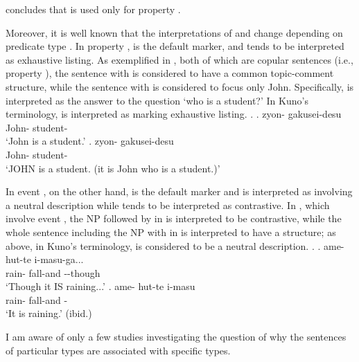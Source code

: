  concludes that
 is used only for property .

Moreover, it is well known that
the interpretations of  and  change
depending on predicate type \cite{kuroda72,kuno73}.
In property ,
 is the default marker, and
 tends to be interpreted as exhaustive listing.
As exemplified in \Next[a-b], both of which are copular sentences (i.e., property ),
the sentence with  \Next[a] is considered to have a common topic-comment structure,
while the sentence with  \Next[b] is considered to focus only John.
Specifically, \Next[b] is interpreted as the answer to the question `who is a student?'
In Kuno's terminology,
 is interpreted as marking exhaustive listing.
%
\largerpage
\ex.
 \ag. zyon- gakusei-desu \\
      John- student- \\
      `John is a student.'
 \bg. zyon- gakusei-desu \\
      John- student- \\
      `JOHN is a student. (it is John who is a student.)'
      \hfill{\cite[38]{kuno73}}

In event ,
on the other hand,
 is the default marker and is interpreted as involving a neutral description %
while  tends to be interpreted as contrastive.
In \Next[a-b], which involve event ,
the NP followed by  in \Next[a] is interpreted to be contrastive,
while the whole sentence including the NP with  in \Next[b] is interpreted to have a  structure;
as above, in Kuno's terminology,
 is considered to be a neutral description.
%
\ex.
 \ag. ame- hut-te i-masu-ga... \\
      rain- fall-and --though \\
      `Though it IS raining...'
 \bg. ame- hut-te i-masu \\
      rain- fall-and - \\
      `It is raining.'
      \hfill{(ibid.)}


I am aware of only a few studies investigating the question of
why the sentences of particular  types are associated with
specific  types.




